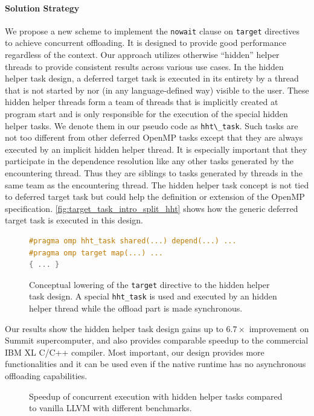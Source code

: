 \paragraph{Solution Strategy}
We propose a new scheme to implement the \lstinline{nowait} clause on \lstinline{target} directives to achieve concurrent offloading.
It is designed to provide good performance regardless of the context.
Our approach utilizes otherwise ``hidden'' helper threads to provide consistent results across various use cases.
In the hidden helper task design, a deferred target task is executed in its entirety by a thread that is not started by nor (in any language-defined way) visible to the user.
These hidden helper threads form a team of threads that is implicitly created at program start and is only responsible for the execution of the special hidden helper tasks.
We denote them in our pseudo code as \lstinline|hht\_task|.
Such tasks are not too different from other deferred OpenMP tasks except that they are always executed by an implicit hidden helper thread.
It is especially important that they participate in the dependence resolution like any other tasks generated by the encountering thread.
Thus they are siblings to tasks generated by threads in the same team as the encountering thread.
The hidden helper task concept is not tied to deferred target task but could help the definition or extension of the OpenMP specification.
\autoref{fig:target_task_intro_split_hht} shows how the generic deferred target task is executed in this design.

\begin{figure}[H]
\begin{lstlisting}[language=C++]
#pragma omp hht_task shared(...) depend(...) ...
#pragma omp target map(...) ...
{ ... }
\end{lstlisting}
\caption{Conceptual lowering of the \lstinline{target} directive to the hidden helper task design.
A special \lstinline{hht_task} is used and executed by an hidden helper thread while the offload part is made synchronous.}
\label{fig:target_task_intro_split_hht}
\end{figure}

Our results show the hidden helper task design gains up to $6.7\times$ improvement on Summit supercomputer, and also provides comparable speedup to the commercial IBM XL C/C++ compiler. Most important, our design provides more functionalities and it can be used even if the native runtime has no asynchronous offloading capabilities.

\begin{figure}[hbt!]
\centering
\subfloat[]{\resizebox{0.45\textwidth}{!}{}}
\subfloat[]{\resizebox{0.45\textwidth}{!}{}}
\caption[]{Speedup of concurrent execution with hidden helper tasks compared to vanilla LLVM with different benchmarks.}
\label{fig:speedup-nw-vanilla}
\end{figure}

